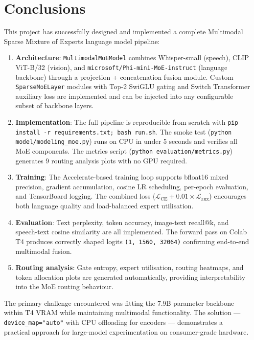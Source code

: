 \documentclass[11pt]{article}
\begin{document}
\section{Conclusions}


This project has successfully designed and implemented a complete Multimodal Sparse Mixture of Experts language model pipeline:


\begin{enumerate}[leftmargin=*]
\item \textbf{Architecture}: \texttt{MultimodalMoEModel} combines Whisper-small (speech), CLIP ViT-B/32 (vision), and \texttt{microsoft/Phi-mini-MoE-instruct} (language backbone) through a projection + concatenation fusion module. Custom \texttt{SparseMoELayer} modules with Top-2 SwiGLU gating and Switch Transformer auxiliary loss are implemented and can be injected into any configurable subset of backbone layers.

\item \textbf{Implementation}: The full pipeline is reproducible from scratch with \texttt{pip install -r requirements.txt; bash run.sh}. The smoke test (\texttt{python model/modeling\_moe.py}) runs on CPU in under 5 seconds and verifies all MoE components. The metrics script (\texttt{python evaluation/metrics.py}) generates 9 routing analysis plots with no GPU required.

\item \textbf{Training}: The Accelerate-based training loop supports bfloat16 mixed precision, gradient accumulation, cosine LR scheduling, per-epoch evaluation, and TensorBoard logging. The combined loss ($\mathcal{L}_{\text{CE}} + 0.01 \times \mathcal{L}_{\text{aux}}$) encourages both language quality and load-balanced expert utilisation.

\item \textbf{Evaluation}: Text perplexity, token accuracy, image-text recall@k, and speech-text cosine similarity are all implemented. The forward pass on Colab T4 produces correctly shaped logits \texttt{(1, 1560, 32064)} confirming end-to-end multimodal fusion.

\item \textbf{Routing analysis}: Gate entropy, expert utilisation, routing heatmaps, and token allocation plots are generated automatically, providing interpretability into the MoE routing behaviour.

\end{enumerate}
The primary challenge encountered was fitting the 7.9B parameter backbone within T4 VRAM while maintaining multimodal functionality. The solution — \texttt{device\_map="auto"} with CPU offloading for encoders — demonstrates a practical approach for large-model experimentation on consumer-grade hardware.
\end{document}
